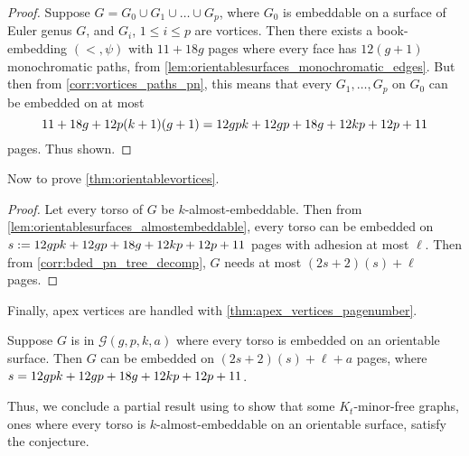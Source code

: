 \begin{proof}
	Suppose $G = G_0 \cup G_1 \cup \ldots \cup G_p$, where $G_0$ is embeddable on a surface of Euler genus $G$, and $G_i$, $1 \leq i \leq p$ are vortices. Then there exists a book-embedding $(<, \psi)$ with $11 + 18g$ pages where every face has $12(g+1)$ monochromatic paths, from \cref{lem:orientablesurfaces_monochromatic_edges}. But then from \cref{corr:vortices_paths_pn}, this means that every $G_1, \ldots, G_p$ on $G_0$ can be embedded on at most \[11 + 18g + 12p(k + 1)(g + 1) = 12gpk + 12gp + 18g + 12kp + 12p + 11 \] pages. Thus shown.
\end{proof}

Now to prove \cref{thm:orientablevortices}. 
\begin{proof}
	Let every torso of $G$ be $k$-almost-embeddable. Then from \cref{lem:orientablesurfaces_almostembeddable}, every torso can be embedded on $s := 12gpk + 12gp + 18g + 12kp + 12p + 11 $ pages with adhesion at most $\ell$. Then from \cref{corr:bded_pn_tree_decomp}, $G$ needs at most $(2s + 2)(s) + \ell$ pages.
\end{proof}

Finally, apex vertices are handled with \cref{thm:apex_vertices_pagenumber}. 
\begin{corollary}\label{corr:orientable_surfaces_gpka}
	Suppose $G$ is in $\mathcal{G}(g, p, k, a)$ where every torso is embedded on an orientable surface. Then $G$ can be embedded on $(2s + 2)(s) + \ell + a$ pages, where $s = 12gpk + 12gp + 18g + 12kp + 12p + 11$. 
\end{corollary}
Thus, we conclude a partial result using \textcite{robertsonGraphMinorsXVI2003} to show that some $K_t$-minor-free graphs, ones where every torso is $k$-almost-embeddable on an orientable surface, satisfy the conjecture.